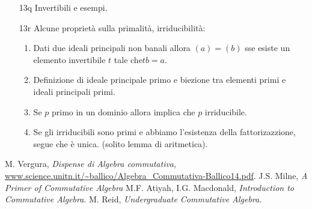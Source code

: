 \documentclass[italian]{article}
\begin{document}
\begin{enumerate}
      \item[13q] Invertibili e esempi.
      \item[13r] Alcune proprietà sulla primalità, irriducibilità: 
        \begin{enumerate}
          \item Dati due ideali principali non banali allora $(a) = (b)$
            sse esiste un elemento invertibile $t$ tale che$tb = a$.
          \item Definizione di ideale principale primo e biezione tra elementi
            primi e ideali principali primi.
          \item Se $p$ primo in un dominio allora implica che $p$
            irriducibile.
          \item Se gli irriducibili sono primi e abbiamo l'esistenza della
            fattorizazzione, segue che è unica. (solito lemma di aritmetica).
        \end{enumerate}
    \end{enumerate}  


    \begin{thebibliography}{9}
       M. Vergura, \textit{Dispense di Algebra commutativa},
        \url{www.science.unitn.it/~ballico/Algebra_Commutativa-Ballico14.pdf}.
       J.S. Milne, \textit{A Primer of Commutative Algebra}
       M.F. Atiyah, I.G. Macdonald, \textit{Introduction to 
            Commutative Algebra}.
       M. Reid, \textit{Undergraduate Commutative Algebra}.
    \end{thebibliography}
\end{document}
